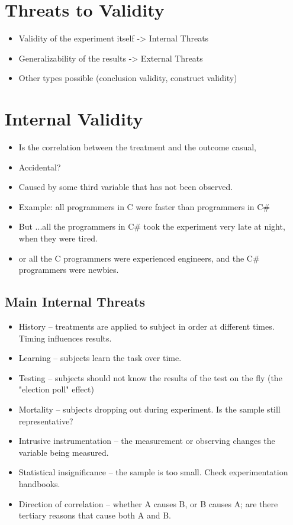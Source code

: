 \section{Threats to Validity}
\begin{itemize}
\item Validity of the experiment itself -> Internal Threats
\item Generalizability of the results -> External Threats
\item Other types possible (conclusion validity, construct validity)
\end{itemize}

\section{Internal Validity}
\begin{itemize}
\item Is the correlation between the treatment and the outcome casual,
\item Accidental?
\item Caused by some third variable that has not been observed.
\item Example: all programmers in C were faster than programmers in C\#
\item But ...all the programmers in C\# took the experiment very late at night, when they were tired.
\item or all the C programmers were experienced engineers, and the C\# programmers were newbies.
\end{itemize}

\subsection{Main Internal Threats}
\begin{itemize}
\item History -- treatments are applied to subject in order at different times. Timing influences results.
\item Learning -- subjects learn the task over time.
\item Testing -- subjects should not know the results of the test on the fly (the "election poll" effect)
\item Mortality -- subjects dropping out during experiment. Is the sample still representative?
\item Intrusive instrumentation -- the measurement or observing changes the variable being measured.
\item Statistical insignificance -- the sample is too small. Check experimentation handbooks.
\item Direction of correlation -- whether A causes B, or B causes A; are there tertiary reasons that cause both A and B.
\end{itemize}

